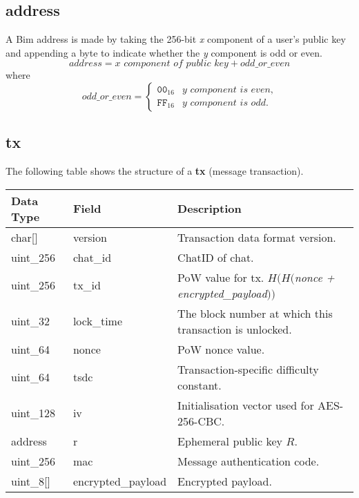 \documentclass{article}
\begin{document}
\subsection{address}
A Bim address is made by taking the 256-bit \textit{x} component of a user's public key and appending a byte to indicate whether the \textit{y} component is odd or even.
\[ \textit{address} = \textit{x component of public key} + \textit{odd\_or\_even} \]
where
\[\textit{odd\_or\_even} = 
\begin{cases}
    \texttt{00}_{16} &\textit{y component is even,} \\[6pt]
    \texttt{FF}_{16} &\textit{y component is odd.}
\end{cases}
\]

\newpage

\subsection{tx}
The following table shows the structure of a \textbf{tx} (message transaction).
\begin{table}[H]
\centering
\begin{tabular}{|p{1.3cm}|p{3cm}|p{5.5cm}|}
\hline
\rowcolor{tblgrey}
Data Type   & Field       & Description\\ \hline
char[\hspace{0.05cm}]    & version     & Transaction data format version.                          \\ \hline
uint\_256   & chat\_id    & ChatID of chat. \\ \hline
uint\_256   & tx\_id      & PoW value for tx. $H(H($\textit{nonce + encrypted\_payload}$))$ \\ \hline
uint\_32    & lock\_time  & The block number at which this transaction is unlocked. \\ \hline
uint\_64    & nonce       & PoW nonce value. \\ \hline
uint\_64    & tsdc        & Transaction-specific difficulty constant.  \\ \hline
uint\_128   & iv          & Initialisation vector used for AES-256-CBC.   \\ \hline
address     & r           & Ephemeral public key $R$.   \\ \hline
uint\_256   & mac         & Message authentication code. \\ \hline
uint\_8[\hspace{0.05cm}]  & encrypted\_payload & Encrypted payload. \\ \hline
\end{tabular}
\end{table}
\end{document}
